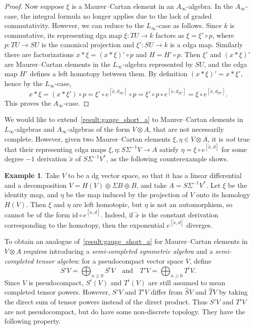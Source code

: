 \documentclass[a4paper,reqno]{amsart}
\theoremstyle{plain}
\theoremstyle{definition}
\newtheorem{exmp}[thm]{Example}
\theoremstyle{remark}
\newcommand{\id}{\mathrm{id}}
\begin{document}
\begin{proof}
  Now suppose $\xi$ is a Maurer--Cartan element in an $A_{\infty}$-algebra. In the $A_{\infty}$-case, the integral formula no longer applies due to the lack of graded commutativity. 
  However, we can reduce to the $L_{\infty}$-case as follows.
  Since $k$ is commutative, its representing dga map $\xi \colon TU \to k$ factors as $\xi=\xi' \circ p$, where $p \colon TU \to SU$ is the canonical projection and $\xi' \colon SU \to k$ is a cdga map. 
  Similarly there are factorizations $x * \xi = (x * \xi)' \circ p$ and $H = H' \circ p$. 
  Then $\xi'$ and $(x * \xi)'$ are Maurer--Cartan elements in the $L_{\infty}$-algebra represented by $SU$, and the cdga map $H'$ defines a left homotopy between them. 
  By definition $(x * \xi)' = x * \xi'$, hence by the $L_{\infty}$-case,
  \[
    x * \xi = (x * \xi') \circ p = \xi' \circ e^{[\tilde{x},d_{SU}]} \circ p
    = \xi' \circ p \circ e^{[\tilde{x},d_{TU}]}
    = \xi \circ e^{[\tilde{x},d_{TU}]}. 
  \]
  This proves the $A_{\infty}$-case.
\end{proof}

We would like to extend~\cref{result:gauge_short_a} to Maurer--Cartan elements in $L_{\infty}$-algebras and $A_{\infty}$-algebras of the form $V \otimes A$, that are not necessarily complete.
However, given two Maurer--Cartan elements $\xi, \eta \in V \otimes A$, it is \emph{not} true that their representing cdga maps $\xi, \eta \colon S\Sigma^{-1} V \to A$ satisfy $\eta = \xi \circ e^{[\tilde{x},d]}$ for some degree $-1$ derivation $\tilde{x}$ of $S\Sigma^{-1}V^*$, as the following counterexample shows.

\begin{exmp}
  Take $V$ to be a dg vector space, so that it has a linear differential and a decomposition $V = H(V) \oplus \Sigma B \oplus B$, and take $A=S\Sigma^{-1}V^*$. 
  Let $\xi$ be the identity map, and $\eta$ be the map induced by the projection of $V$ onto its homology $H(V)$.
  Then $\xi$ and $\eta$ are left homotopic, but $\eta$ is not an automorphism, so cannot be of the form $\id \circ e^{[\tilde{x},d]}$.
  Indeed, if $\tilde{x}$ is the constant derivation corresponding to the homotopy, then the exponential $e^{[\tilde{x},d]}$ diverges.
\end{exmp}

To obtain an analogue of~\cref{result:gauge_short_a} for Maurer--Cartan elements in $V \otimes A$ requires introducing a \emph{semi-completed symmetric algebra} and a \emph{semi-completed tensor algebra}: for a pseudocompact vector space $V$, define
\[
  S'V = \bigoplus_{n \geq 0} S^i{V} \quad \text{and} \quad
  T'V = \bigoplus_{n \geq 0} T^i{V}.
\]
Since $V$ is pseudocompact, $S^i(V)$ and $T^i(V)$ are still assumed to mean completed tensor powers. However, $S'V$ and $T'V$ differ from $\widehat{S}V$ and $\widehat{T}V$ by taking the direct sum of tensor powers instead of the direct product. 
Thus $S'V$ and $T'V$ are not pseudocompact, but do have some non-discrete topology.
They have the following property.
\end{document}
